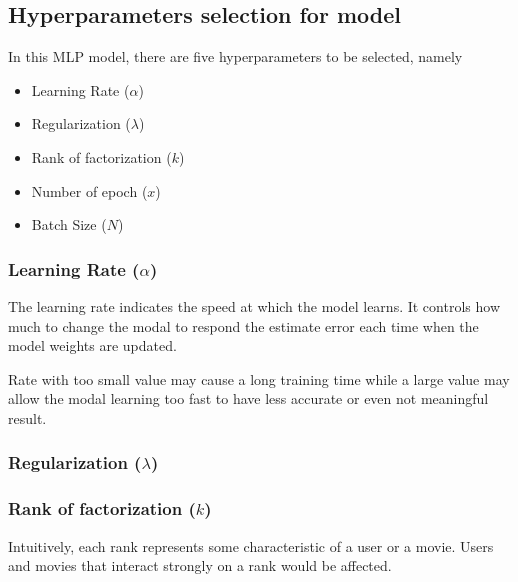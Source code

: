 \documentclass[final]{cvpr}
\begin{document}
\subsection{Hyperparameters selection for model}
In this MLP model, there are five hyperparameters to be selected, namely
\begin{itemize}
	\item Learning Rate ($\alpha$)
	\item Regularization ($\lambda$)
	\item Rank of factorization ($k$)
	\item Number of epoch ($x$)
	\item Batch Size ($N$)
\end{itemize}


\subsubsection{Learning Rate ($\alpha$)}
The learning rate indicates the speed at which the model learns. It controls how much to change the modal to respond the estimate error each time when the model weights are updated.

Rate with too small value may cause a long training time while a large value may allow the modal learning too fast to have less accurate or even not meaningful result.

\subsubsection{Regularization ($\lambda$)}


\subsubsection{Rank of factorization ($k$)}
Intuitively, each rank represents some characteristic of a user or a movie. Users and movies that interact strongly on a rank would be affected.
\end{document}
